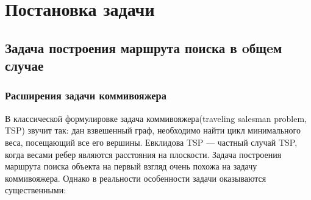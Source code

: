 \chapter{Постановка задачи}
\label{chapSVD}

\section{Задача построения маршрута поиска в oбщeм случае}


\subsection{Расширения задачи коммивояжера}
В классической формулировке задача коммивояжера(traveling salesman problem, TSP) \cite{app07} звучит
 так:
 дан взвешенный граф, необходимо найти цикл минимального веса, посещающий все его вершины.
 Евклидова TSP --- частный случай TSP, когда весами ребер являются
расстояния на плоскости. 
 Задача построения маршрута поиска объекта на первый взгляд очень похожа на задачу коммивояжера.
Однако в реальности особенности задачи оказываются существенными:
